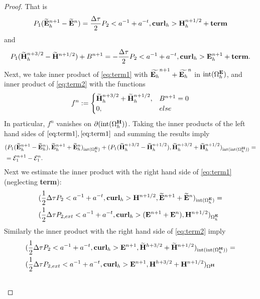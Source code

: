 \documentclass[12pt,reqno]{amsart}
\newcommand{\curl}{{\bf curl}}
\newcommand{\e}{{\bf E}}
\newcommand{\h}{{\bf H}}
\theoremstyle{definition}
\numberwithin{equation}{section}
\newcommand{\intr}[1]{\mathrm{int}(#1)}
\def\Gw{\Omega}     \def\Gx{\Xi}         \def\Gy{\Psi}
\def\Gwh{\Omega_h}
\begin{document}
\begin{proof}
That is 
\begin{equation}\label{eq:term1}
		P_1(\widetilde{\e}_h^{n+1} -\widetilde{\e}^{n})=
	\frac{\Delta \tau}{2}P_2<a^{-1}+a^{-t},\curl_h>\h_h^{n+1/2}
+{\bf term}
\end{equation}
and
	\begin{equation}\label{eq:term2}
		P_1(\widetilde{\h}_h^{n+3/2} -\widetilde{\h}^{n+1/2})+B^{n+1}
	=
		-\frac{\Delta \tau}{2}P_2<a^{-1}+a^{-t},\curl_h>\e_h^{n+1}
+{\bf term}.
	\end{equation}
	Next, we take inner product of \eqref{eq:term1} with $\widetilde{\e_h}^{n+1}+\widetilde{\e_h}^n$ in $\intr{\Gwh^\e}$,
	and inner product of \eqref{eq:term2} with the functions 
	$$
	f^n:=
	\begin{cases}
		\widetilde{\h}_h^{n+3/2}+\widetilde{\h}_h^{n+1/2}, & B^{n+1}=0\\
		0,& else
	\end{cases}
	$$
In particular, $f^n$ vanishes on $\partial({\intr{\Gwh^\h}})$.
Taking the inner products of the left hand sides of $\eqref{eq:term1},\eqref{eq:term1}$ and summing the results imply
	\begin{align*}
		&
		(P_1(\widetilde{\e}^{n+1}_h-\widetilde{\e}^{n}_h),\widetilde{\e}^{n+1}_h+\widetilde{\e}^{n}_h)_{\intr{\Gwh^\e}}+
		(P_1(\widetilde{\h}^{n+3/2}_h-\widetilde{\h}^{n+1/2}_h),\widetilde{\h}^{n+3/2}_h+\widetilde{\h}^{n+1/2}_h)_{\intr{\intr{\Gwh^\h}}}=\\&
		=\mathcal{E}_1^{n+1}-\mathcal{E}_1^{n}.
	\end{align*}
	Next we estimate the inner product with the  right hand side of \eqref{eq:term1} (neglecting {\bf term}):
	\begin{align*}
		&
		(\frac{1}{2}\Delta \tau P_2<a^{-1}+a^{-t},\curl_h>\h^{n+1/2},\widetilde{\e}^{n+1}+\widetilde{\e}^{n})_{ \intr{\Gwh^\e}}=\\&
		(\frac{1}{2}\Delta \tau P_{2,ext}<a^{-1}+a^{-t},\curl_h>(\e^{n+1}+\e^{n}),\h^{n+1/2})_{ {\Gwh^\e}}
	\end{align*}
	Similarly the inner product with the  right hand side of \eqref{eq:term2} imply
	\begin{align*}
		&
		(\frac{1}{2}\Delta \tau P_2<a^{-1}+a^{-t},\curl_h>\e^{n+1},\widetilde{\h}^{h+3/2}+\widetilde{\h}^{n+1/2})_{\intr{\intr{\Gwh^\h}}}=\\&
		(\frac{1}{2}\Delta \tau P_{2,ext}<a^{-1}+a^{-t},\curl_h>\e^{n+1},\h^{h+3/2}+\h^{n+1/2})_{{\Gw^\h}}
		\\&

\end{align*}
\end{proof}
\end{document}
